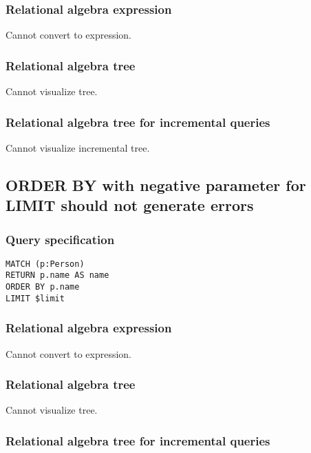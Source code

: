 \subsubsection*{Relational algebra expression}

Cannot convert to expression.

\subsubsection*{Relational algebra tree}

Cannot visualize tree.

\subsubsection*{Relational algebra tree for incremental queries}

Cannot visualize incremental tree.

\subsection{ORDER BY with negative parameter for LIMIT should not generate errors}

\subsubsection*{Query specification}

\begin{lstlisting}
MATCH (p:Person)
RETURN p.name AS name
ORDER BY p.name
LIMIT $limit
\end{lstlisting}

\subsubsection*{Relational algebra expression}

Cannot convert to expression.

\subsubsection*{Relational algebra tree}

Cannot visualize tree.

\subsubsection*{Relational algebra tree for incremental queries}

